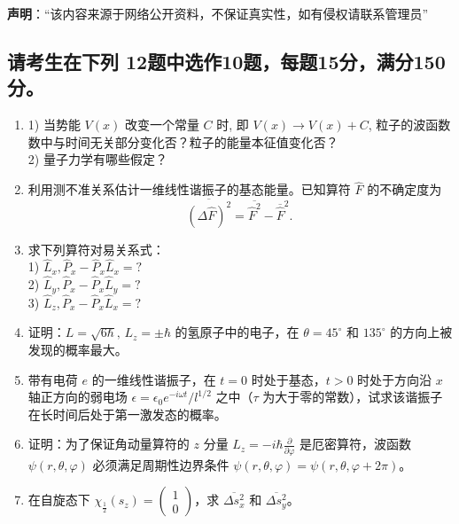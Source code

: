 
\textbf{声明}：“该内容来源于网络公开资料，不保证真实性，如有侵权请联系管理员”

\subsection{请考生在下列 12题中选作10题，每题15分，满分150分。}
\begin{enumerate}
    \item 1) 当势能 $V(x)$ 改变一个常量 $C$ 时, 即 $V(x) \rightarrow V(x) + C$, 粒子的波函数数中与时间无关部分变化否？粒子的能量本征值变化否？\\
   2) 量子力学有哪些假定？
    \item 利用测不准关系估计一维线性谐振子的基态能量。已知算符 $\hat{F}$ 的不确定度为
    \[
    \overline{(\Delta \hat{F})^2} = \overline{\hat{F}^2}-  \overline{\hat{F}} ^2.~
    \]
    \item 求下列算符对易关系式：\\
    1) $\hat{L}_x, \hat{P}_x - \hat{P}_x \hat{L}_x=?$\\
    2) $\hat{L}_y, \hat{P}_x - \hat{P}_x \hat{L}_y=?$\\
    3) $\hat{L}_z, \hat{P}_x - \hat{P}_x \hat{L}_x=?$\\
    \item 证明：$L = \sqrt{6\hbar}, \, L_z = \pm \hbar$ 的氢原子中的电子，在 $\theta = 45^\circ$ 和 $135^\circ$ 的方向上被发现的概率最大。
    \item 带有电荷 $e$ 的一维线性谐振子，在 $t = 0$ 时处于基态，$t > 0$ 时处于方向沿 $x$ 轴正方向的弱电场 $\epsilon = \epsilon_0 e^{-i\omega t}/l^{1/2}$ 之中（$\tau$ 为大于零的常数），试求该谐振子在长时间后处于第一激发态的概率。
    \item 证明：为了保证角动量算符的 $z$ 分量 $L_z = -i\hbar \frac{\partial}{\partial \varphi}$ 是厄密算符，波函数 $\psi(r, \theta, \varphi)$ 必须满足周期性边界条件 $\psi(r, \theta, \varphi) = \psi(r, \theta, \varphi + 2\pi)$。
    \item 在自旋态下 $\chi_{\frac{1}{2}}(s_z) = \begin{pmatrix} 1 \\ 0 \end{pmatrix}$，求 $\overline{\Delta s_x^2}$ 和 $\overline{\Delta s_y^2}$。
\end{enumerate}
